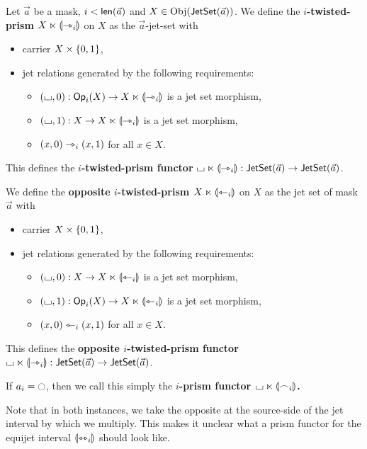 \documentclass[a4paper]{memoir}
\begin{document}
\begin{definition} \label{def:prism}
	Let $\vec a$ be a mask, $i < \mathsf{len}(\vec a)$ and $X \in \mathrm{Obj}(\mathsf{JetSet}(\vec a))$.
	We define the \textbf{$i$-twisted-prism $X \ltimes {\llparenthesis \rightarrowtriangle_i \rrparenthesis}$} on $X$ as the $\vec a$-jet-set with
	\begin{itemize}
		\item carrier $X \times \mathopen{}\left\{ 0, 1 \right\}\mathclose{}$,
		\item jet relations generated by the following requirements:
		\begin{itemize}
			\item $({\llcorner\hspace{-.4ex}\lrcorner}, 0) : {\mathsf{Op}}_i(X) \to X \ltimes {\llparenthesis \rightarrowtriangle_i \rrparenthesis}$ is a jet set morphism,
			\item $({\llcorner\hspace{-.4ex}\lrcorner}, 1) : X \to X \ltimes {\llparenthesis \rightarrowtriangle_i \rrparenthesis}$ is a jet set morphism,
			\item $(x, 0) \rightarrowtriangle_i (x, 1)$ for all $x \in X$.
		\end{itemize}
	\end{itemize}
	This defines the \textbf{$i$-twisted-prism functor} ${\llcorner\hspace{-.4ex}\lrcorner} \ltimes {\llparenthesis \rightarrowtriangle_i \rrparenthesis} : \mathsf{JetSet}(\vec a) \to \mathsf{JetSet}(\vec a)$.
	
	We define the \textbf{opposite $i$-twisted-prism $X \ltimes {\llparenthesis \leftarrowtriangle_i \rrparenthesis}$} on $X$ as the jet set of mask $\vec a$ with
	\begin{itemize}
		\item carrier $X \times \mathopen{}\left\{ 0, 1 \right\}\mathclose{}$,
		\item jet relations generated by the following requirements:
		\begin{itemize}
			\item $({\llcorner\hspace{-.4ex}\lrcorner}, 0) : X \to X \ltimes {\llparenthesis \leftarrowtriangle_i \rrparenthesis}$ is a jet set morphism,
			\item $({\llcorner\hspace{-.4ex}\lrcorner}, 1) : {\mathsf{Op}}_i(X) \to X \ltimes {\llparenthesis \leftarrowtriangle_i \rrparenthesis}$ is a jet set morphism,
			\item $(x, 0) \leftarrowtriangle_i (x, 1)$ for all $x \in X$.
		\end{itemize}
	\end{itemize}
	This defines the \textbf{opposite $i$-twisted-prism functor} ${\llcorner\hspace{-.4ex}\lrcorner} \ltimes {\llparenthesis \rightarrowtriangle_i \rrparenthesis} : \mathsf{JetSet}(\vec a) \to \mathsf{JetSet}(\vec a)$.
	
	If $a_i = \npolar$, then we call this simply the \textbf{$i$-prism functor ${\llcorner\hspace{-.4ex}\lrcorner} \ltimes {\llparenthesis \frown_i \rrparenthesis}$.}
\end{definition}
Note that in both instances, we take the opposite at the source-side of the jet interval by which we multiply. This makes it unclear what a prism functor for the equijet interval ${\llparenthesis \leftrightarrowtriangle_i \rrparenthesis}$ should look like.
\end{document}
